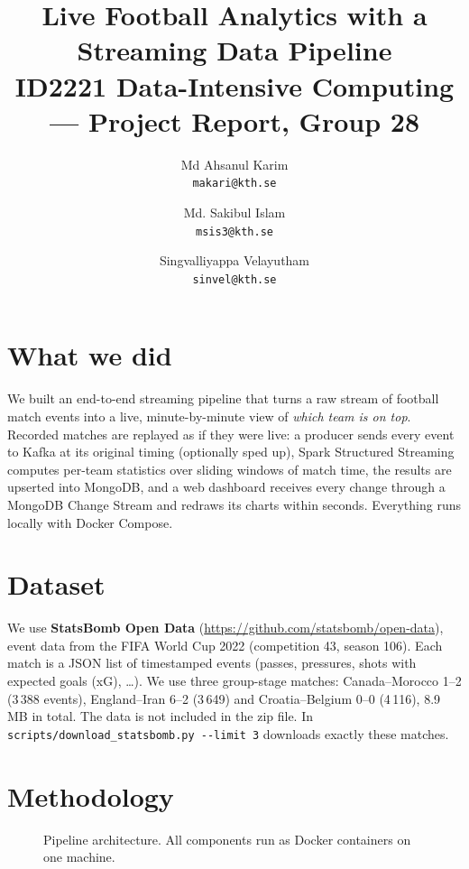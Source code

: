 \documentclass[10pt,a4paper]{article}
\title{\vspace{-1.2cm}\textbf{Live Football Analytics with a Streaming Data Pipeline}\\[2pt]
\large ID2221 Data-Intensive Computing --- Project Report, Group 28}
\author{Md Ahsanul Karim\\ \texttt{\small makari@kth.se}
  \and Md. Sakibul Islam\\ \texttt{\small msis3@kth.se}
  \and Singvalliyappa Velayutham\\ \texttt{\small sinvel@kth.se}}
\date{\vspace{-0.6cm}}
\begin{document}
\maketitle

\section{What we did}
We built an end-to-end streaming pipeline that turns a raw stream of football match events into a
live, minute-by-minute view of \emph{which team is on top}. Recorded matches are replayed as if they
were live: a producer sends every event to Kafka at its original timing (optionally sped up), Spark
Structured Streaming computes per-team statistics over sliding windows of match time, the results are
upserted into MongoDB, and a web dashboard receives every change through a MongoDB Change Stream and
redraws its charts within seconds. Everything runs locally with Docker Compose.

\section{Dataset}
We use \textbf{StatsBomb Open Data} (\url{https://github.com/statsbomb/open-data}), event data from the
FIFA World Cup 2022 (competition 43, season 106). Each match is a JSON list of timestamped events
(passes, pressures, shots with expected goals (xG), \dots). We use three group-stage matches: Canada--Morocco 1--2 (3\,388 events),
England--Iran 6--2 (3\,649) and Croatia--Belgium 0--0 (4\,116), 8.9\,MB in total. The data is not
included in the zip file. In \texttt{scripts/download\_statsbomb.py -{}-limit 3} downloads exactly these matches.

\section{Methodology}
\begin{figure}[!htb]
\centering
{}
\caption{Pipeline architecture. All components run as Docker containers on one machine.}
\end{figure}
\end{document}
